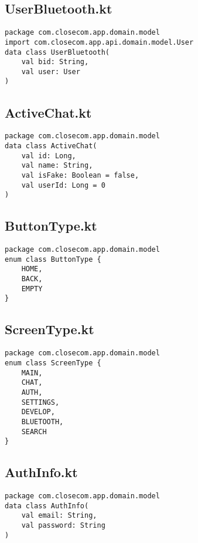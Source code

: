 \documentclass[listing]{espd}
\begin{document}
\subsection{UserBluetooth.kt}
\begin{verbatim}
package com.closecom.app.domain.model
import com.closecom.app.api.domain.model.User
data class UserBluetooth(
    val bid: String,
    val user: User
)
\end{verbatim}

\subsection{ActiveChat.kt}
\begin{verbatim}
package com.closecom.app.domain.model
data class ActiveChat(
    val id: Long,
    val name: String,
    val isFake: Boolean = false,
    val userId: Long = 0
)
\end{verbatim}

\subsection{ButtonType.kt}
\begin{verbatim}
package com.closecom.app.domain.model
enum class ButtonType {
    HOME,
    BACK,
    EMPTY
}
\end{verbatim}

\subsection{ScreenType.kt}
\begin{verbatim}
package com.closecom.app.domain.model
enum class ScreenType {
    MAIN,
    CHAT,
    AUTH,
    SETTINGS,
    DEVELOP,
    BLUETOOTH,
    SEARCH
}
\end{verbatim}

\subsection{AuthInfo.kt}
\begin{verbatim}
package com.closecom.app.domain.model
data class AuthInfo(
    val email: String,
    val password: String
)
\end{verbatim}
\end{document}

